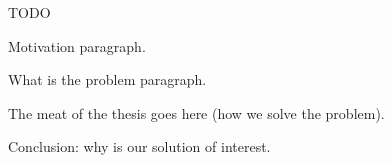 TODO

Motivation paragraph.

What is the problem paragraph.

The meat of the thesis goes here (how we solve the problem).

Conclusion: why is our solution of interest.
